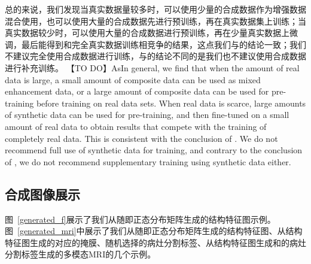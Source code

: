 \documentclass[letterpaper]{article} %
\begin{document}
总的来说，我们发现当真实数据量较多时，可以使用少量的合成数据作为增强数据混合使用，也可以使用大量的合成数据先进行预训练，再在真实数据集上训练；当真实数据较少时，可以使用大量的合成数据进行预训练，再在少量真实数据上微调，最后能得到和完全真实数据训练相竞争的结果，这点我们与\cite{4shin2018medical}的结论一致；我们不建议完全使用合成数据进行训练，与\cite{4shin2018medical}的结论不同的是我们也不建议使用合成数据进行补充训练。
【TO DO】AsIn general, we find that when the amount of real data is large, a small amount of composite data can be used as mixed enhancement data, or a large amount of composite data can be used for pre-training before training on real data sets. When real data is scarce, large amounts of synthetic data can be used for pre-training, and then fine-tuned on a small amount of real data to obtain results that compete with the training of completely real data. This is consistent with the conclusion of \cite{4shin2018medical}. We do not recommend full use of synthetic data for training, and contrary to the conclusion of \cite{4shin2018medical}, we do not recommend supplementary training using synthetic data either.

\subsection{合成图像展示}
图~\ref{generated_f}展示了我们从随即正态分布矩阵生成的结构特征图示例。图~\ref{generated_mri}中展示了我们从随即正态分布矩阵生成的结构特征图、从结构特征图生成的对应的掩膜、随机选择的病灶分割标签、从结构特征图生成和的病灶分割标签生成的多模态MRI的几个示例。
\end{document}
